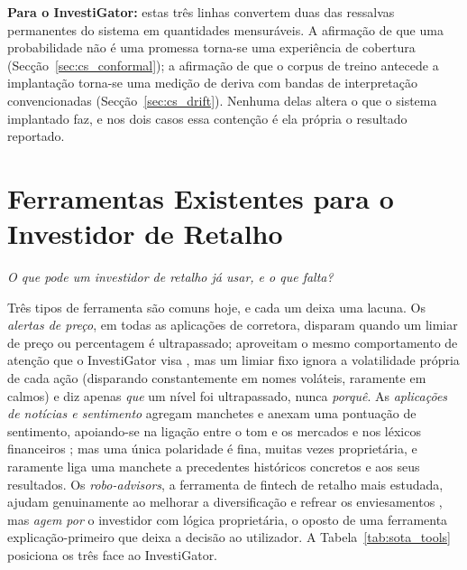 \textbf{Para o InvestiGator:} estas três linhas convertem duas das ressalvas permanentes do sistema
em quantidades mensuráveis. A afirmação de que uma probabilidade não é uma promessa torna-se uma
experiência de cobertura (Secção~\ref{sec:cs_conformal}); a afirmação de que o corpus de treino
antecede a implantação torna-se uma medição de deriva com bandas de interpretação convencionadas
(Secção~\ref{sec:cs_drift}). Nenhuma delas altera o que o sistema implantado faz, e nos dois casos
essa contenção é ela própria o resultado reportado.

\section{Ferramentas Existentes para o Investidor de Retalho}
\label{sec:sota_tools}

\emph{O que pode um investidor de retalho já usar, e o que falta?}

Três tipos de ferramenta são comuns hoje, e cada um deixa uma lacuna. Os \emph{alertas de preço}, em todas
as aplicações de corretora, disparam quando um limiar de preço ou percentagem é ultrapassado; aproveitam o
mesmo comportamento de atenção que o InvestiGator visa \autocite{barber2008glitters}, mas um limiar fixo
ignora a volatilidade própria de cada ação (disparando constantemente em nomes voláteis, raramente em
calmos) e diz apenas \emph{que} um nível foi ultrapassado, nunca \emph{porquê}. As \emph{aplicações de
notícias e sentimento} agregam manchetes e anexam uma pontuação de sentimento, apoiando-se na ligação
entre o tom e os mercados \autocite{tetlock2007media} e nos léxicos financeiros
\autocite{loughran2011liability}; mas uma única polaridade é fina, muitas vezes proprietária, e raramente
liga uma manchete a precedentes históricos concretos e aos seus resultados. Os \emph{robo-advisors}, a
ferramenta de fintech de retalho mais estudada, ajudam genuinamente ao melhorar a diversificação e refrear
os enviesamentos \autocite{dacunto2019robo, cardillo2024robo}, mas \emph{agem por} o investidor com lógica
proprietária, o oposto de uma ferramenta explicação-primeiro que deixa a decisão ao utilizador. A
Tabela~\ref{tab:sota_tools} posiciona os três face ao InvestiGator.

